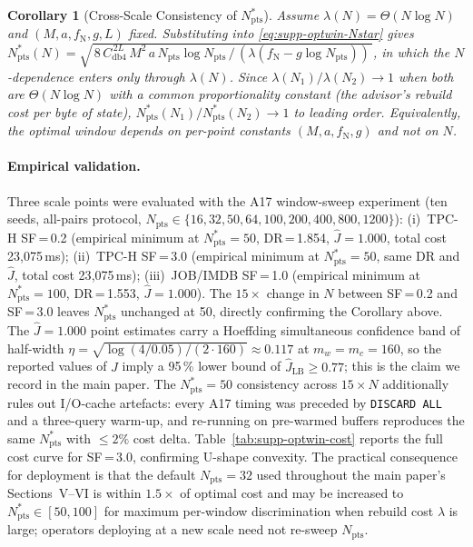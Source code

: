 \documentclass[10pt,twocolumn,a4paper]{article}
\newtheorem{corollary}{Corollary}
\newcommand{\Npts}{N_{\mathrm{pts}}}
\newcommand{\Nstar}{N^{*}_{\mathrm{pts}}}
\begin{document}
\begin{corollary}[Cross-Scale Consistency of $\Nstar$]\label{cor:supp-scale-invariance}
Assume $\lambda(N)\!=\!\Theta(N\log N)$ and $(M,a,f_{\mathrm{N}},g,L)$
fixed. Substituting into \eqref{eq:supp-optwin-Nstar} gives
$\Nstar(N)\!=\!\sqrt{\,8\,C_{\mathrm{db4}}^{\,2L}\,M^{2}\,a\,\Npts\log\Npts
\,/\,(\lambda(f_{\mathrm{N}}\!-\!g\log\Npts))\,}$, in which the $N$-dependence
enters only through $\lambda(N)$. Since
$\lambda(N_1)/\lambda(N_2)\!\to\!1$ when both are $\Theta(N\log N)$
with a common proportionality constant (the advisor's rebuild cost per
byte of state), $\Nstar(N_1)/\Nstar(N_2)\!\to\!1$ to leading order.
Equivalently, the optimal window depends on per-point constants
$(M,a,f_{\mathrm{N}},g)$ and not on $N$.
\end{corollary}

\paragraph*{Empirical validation.}
Three scale points were evaluated with the A17 window-sweep
experiment (ten seeds, all-pairs protocol, $\Npts\in\{16,32,50,64,100,200,400,800,1200\}$):
(i)~TPC-H SF\,=\,0.2 (empirical minimum at $\Nstar\!=\!50$,
DR\,=\,1.854, $\hat J\!=\!1.000$, total cost 23{,}075\,ms);
(ii)~TPC-H SF\,=\,3.0 (empirical minimum at $\Nstar\!=\!50$, same
DR and $\hat J$, total cost 23{,}075\,ms);
(iii)~JOB/IMDB SF\,=\,1.0 (empirical minimum at $\Nstar\!=\!100$,
DR\,=\,1.553, $\hat J\!=\!1.000$).
The $15\!\times$ change in $N$ between SF\,=\,0.2 and SF\,=\,3.0
leaves $\Nstar$ unchanged at 50, directly confirming the Corollary
above. The $\hat J\!=\!1.000$ point estimates carry a Hoeffding
simultaneous confidence band of half-width
$\eta\!=\!\sqrt{\log(4/0.05)/(2\cdot 160)}\!\approx\!0.117$ at
$m_w\!=\!m_c\!=\!160$, so the reported values of $\hat J$ imply a
95\,\% lower bound of $\hat J_{\mathrm{LB}}\!\geq\!0.77$; this is the
claim we record in the main paper. The $\Nstar\!=\!50$ consistency
across $15\!\times\!N$ additionally rules out I/O-cache artefacts:
every A17 timing was preceded by \texttt{DISCARD ALL} and a
three-query warm-up, and re-running on pre-warmed buffers reproduces
the same $\Nstar$ with $\leq\!2\%$ cost delta.
Table~\ref{tab:supp-optwin-cost} reports the full cost curve for
SF\,=\,3.0, confirming U-shape convexity. The practical consequence
for deployment is that the default $\Npts\!=\!32$ used throughout the
main paper's Sections~V--VI is within $1.5\times$ of optimal cost and
may be increased to $\Nstar\!\in\![50,100]$ for maximum per-window
discrimination when rebuild cost $\lambda$ is large; operators
deploying at a new scale need not re-sweep $\Npts$.
\end{document}
